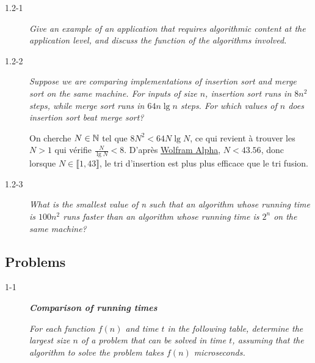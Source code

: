 \begin{description}
  \item[1.2-1] {\itshape Give an example of an application that requires algorithmic content at the application level, and discuss the function of the algorithms involved.}

    \begin{exrev}
      
    \end{exrev}

  \item[1.2-2] {\itshape Suppose we are comparing implementations of insertion sort and merge sort on the same machine. For inputs of size $n$, insertion sort runs in $8n^2$ steps, while merge sort runs in $64n\lg n$ steps. For which values of $n$ does insertion sort beat merge sort?}

    \begin{ex}
      On cherche $N \in \mathbb{N}$ tel que $8N^2 < 64N\lg N$, ce qui revient \`a trouver les $N > 1$ qui v\'erifie $\frac{N}{\lg N} < 8$. D'apr\`es \href{https://www.wolframalpha.com/input/?i=N%2Flog_2(N)+%3C+8}{Wolfram Alpha}, $N < 43.56$, donc lorsque $N\in\llbracket 1,43  \rrbracket$, le tri d'insertion est plus plus efficace que le tri fusion.
    \end{ex}

  \item[1.2-3] {\itshape What is the smallest value of n such that an algorithm whose running time is $100n^2$ runs faster than an algorithm whose running time is $2^n$ on the same machine?}

    \begin{exrev}
    \end{exrev}  

\end{description}

\subsection{Problems} 

\begin{description}
  \item[1-1] \textbf{\itshape Comparison of running times}

    {\itshape For each function $f(n)$ and time $t$ in the following table, determine the largest size $n$ of a problem that can be solved in time $t$, assuming that the algorithm to solve the problem takes $f(n)$ microseconds.}

    \begin{pbrev}
      
    \end{pbrev}


\end{description}


